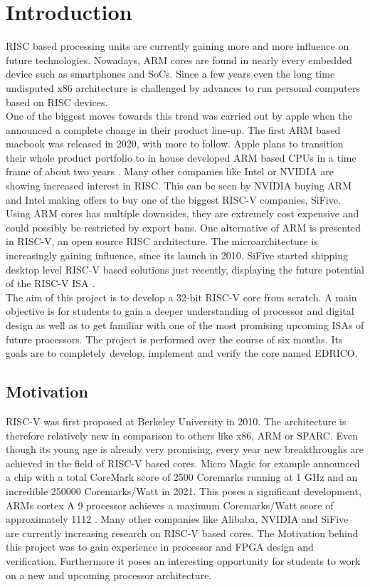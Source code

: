 
\chapter{Introduction}
\ac{RISC} based processing units are currently gaining more and more influence on future technologies. Nowadays, \ac{ARM} cores are found in nearly every embedded device such as smartphones and \acp{SoC}. Since a few years even the long time undisputed x86 architecture is challenged by advances to run personal computers based on \ac{RISC} devices.\\
One of the biggest moves towards this trend was carried out by apple when the announced a complete change in their product line-up. The first \ac{ARM} based macbook was released in 2020, with more to follow. Apple plans to transition their whole product portfolio to in house developed \ac{ARM} based \acp{CPU} in a time frame of about two years \cite{apple}. 
Many other companies like Intel or NVIDIA are showing increased interest in RISC. This can be seen by NVIDIA buying ARM and Intel making offers to buy one of the biggest RISC-V companies, SiFive. \\
Using ARM cores has multiple downsides, they are extremely cost expensive and could possibly be restricted by export bans. One alternative of ARM is presented in RISC-V, an open source \ac{RISC} architecture. The microarchitecture is increasingly gaining influence, since its launch in 2010. SiFive started shipping desktop level RISC-V based solutions just recently, displaying the future potential of the RISC-V \ac{ISA} \cite{hifive}. \\
The aim of this project is to develop a 32-bit RISC-V core from scratch. A main objective is for students to gain a deeper understanding of processor and digital design as well as to get familiar with one of the most promising upcoming \acp{ISA} of future processors. The project is performed over the course of six months. Its goals are to completely develop, implement and verify the core named \ac{EDRICO}.
\clearpage
\section{Motivation}
RISC-V was first proposed at Berkeley University in 2010. The architecture is
therefore relatively new in comparison to others like x86, ARM or SPARC. Even
though its young age is already very promising, every year new breakthroughs are
achieved in the field of RISC-V based cores.
Micro Magic for example announced a chip with a total CoreMark score of
2500 Coremarks running at 1 GHz and an incredible 250000 Coremarks/Watt  in 2021. This poses a significant
development, \acp{ARM} cortex A 9 processor achieves a maximum Coremarks/Watt score of approximately 1112 \cite{arma9}.
Many other companies like Alibaba, NVIDIA and SiFive are currently increasing
research on RISC-V based cores.
The Motivation behind this project was to gain experience in processor and \ac{FPGA}
design and verification. Furthermore it poses an interesting opportunity for students
to work on a new and upcoming processor architecture.

